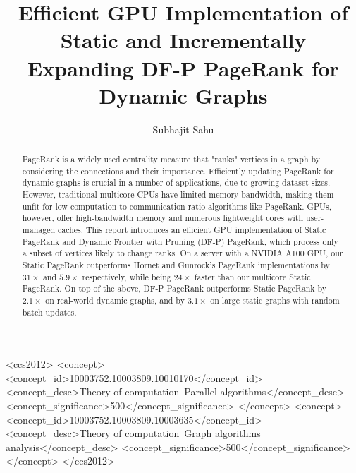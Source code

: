 \documentclass[sigconf,nonacm]{acmart}
\begin{document}
\title[Efficient GPU Implementation of Static and Incrementally Expanding DF-P PageRank for Dynamic Graphs]{Efficient GPU Implementation of Static and Incrementally Expanding DF-P PageRank for Dynamic Graphs}


\author{Subhajit Sahu}



\begin{abstract}
PageRank is a widely used centrality measure that "ranks" vertices in a graph by considering the connections and their importance. Efficiently updating PageRank for dynamic graphs is crucial in a number of applications, due to growing dataset sizes. However, traditional multicore CPUs have limited memory bandwidth, making them unfit for low computation-to-communication ratio algorithms like PageRank. GPUs, however, offer high-bandwidth memory and numerous lightweight cores with user-managed caches. This report introduces an efficient GPU implementation of Static PageRank and Dynamic Frontier with Pruning (DF-P) PageRank, which process only a subset of vertices likely to change ranks. On a server with a NVIDIA A100 GPU, our Static PageRank outperforms Hornet and Gunrock's PageRank implementations by $31\times$ and $5.9\times$ respectively, while being $24\times$ faster than our multicore Static PageRank. On top of the above, DF-P PageRank outperforms Static PageRank by $2.1\times$ on real-world dynamic graphs, and by $3.1\times$ on large static graphs with random batch updates.
\end{abstract}




\begin{CCSXML}
<ccs2012>
<concept>
<concept_id>10003752.10003809.10010170</concept_id>
<concept_desc>Theory of computation~Parallel algorithms</concept_desc>
<concept_significance>500</concept_significance>
</concept>
<concept>
<concept_id>10003752.10003809.10003635</concept_id>
<concept_desc>Theory of computation~Graph algorithms analysis</concept_desc>
<concept_significance>500</concept_significance>
</concept>
</ccs2012>
\end{CCSXML}
\end{document}
